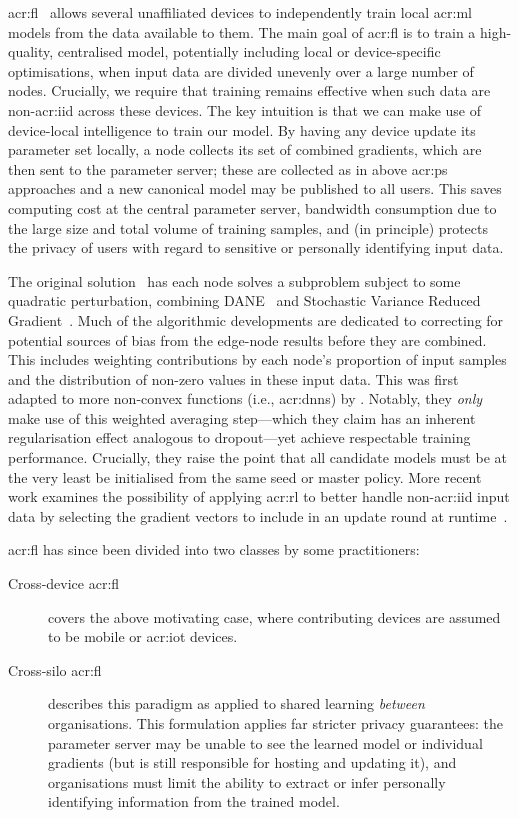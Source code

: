 \acrfull{acr:fl}~\parencite{DBLP:journals/corr/KonecnyMRR16,DBLP:journals/corr/Konecny17,DBLP:conf/mlsys/BonawitzEGHIIKK19} allows several unaffiliated devices to independently train local \gls{acr:ml} models from the data available to them.
The main goal of \gls{acr:fl} is to train a high-quality, centralised model, potentially including local or device-specific optimisations, when input data are divided unevenly over a large number of nodes.
Crucially, we require that training remains effective when such data are non-\gls{acr:iid} across these devices.
The key intuition is that we can make use of device-local intelligence to train our model.
By having any device update its parameter set locally, a node collects its set of combined gradients, which are then sent to the parameter server; these are collected as in above \gls{acr:ps} approaches and a new canonical model may be published to all users.
This saves computing cost at the central parameter server, bandwidth consumption due to the large size and total volume of training samples, and (in principle) protects the privacy of users with regard to sensitive or personally identifying input data.

The original solution~\parencite{DBLP:journals/corr/KonecnyMRR16} has each node solves a subproblem subject to some quadratic perturbation, combining DANE~\parencite{DBLP:conf/icml/ShamirS014} and Stochastic Variance Reduced Gradient~\parencite{DBLP:conf/nips/Johnson013}.
Much of the algorithmic developments are dedicated to correcting for potential sources of bias from the edge-node results before they are combined.
This includes weighting contributions by each node's proportion of input samples and the distribution of non-zero values in these input data.
This was first adapted to more non-convex functions (i.e., \glspl{acr:dnn}) by \textcite{DBLP:conf/aistats/McMahanMRHA17}.
Notably, they \emph{only} make use of this weighted averaging step---which they claim has an inherent regularisation effect analogous to dropout---yet achieve respectable training performance.
Crucially, they raise the point that all candidate models must be at the very least be initialised from the same seed or master policy.
More recent work examines the possibility of applying \gls{acr:rl} to better handle non-\gls{acr:iid} input data by selecting the gradient vectors to include in an update round at runtime~\parencite{DBLP:conf/infocom/WangKNL20}.

\gls{acr:fl} has since been divided into two classes by some practitioners:
\begin{description}
	\item[Cross-device \gls{acr:fl}] covers the above motivating case, where contributing devices are assumed to be mobile or \gls{acr:iot} devices.
	\item[Cross-silo \gls{acr:fl}] describes this paradigm as applied to shared learning \emph{between} organisations. This formulation applies far stricter privacy guarantees: the parameter server may be unable to see the learned model or individual gradients (but is still responsible for hosting and updating it), and organisations must limit the ability to extract or infer personally identifying information from the trained model.
\end{description}

